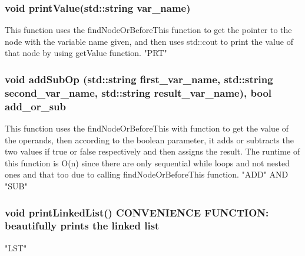 \documentclass[a4paper]{article}
\begin{document}
    \subsubsection{{\color{orange}void} {\color{draculapurple}printValue}({\color{orange}std::string} var\_name)}
    This function uses the {\color{draculapurple}findNodeOrBeforeThis} function to 
    get the pointer to the node with the variable name given, and then uses 
    {\color{orange}std::cout} to print the value of that node by using 
    {\color{draculapurple}getValue} function. "PRT"
    \subsubsection{{\color{orange}void} {\color{draculapurple}addSubOp}
    ({\color{orange}std::string} first\_var\_name, 
    {\color{orange}std::string} second\_var\_name,\newline 
    {\color{orange}std::string} result\_var\_name), 
    {\color{orange}bool} add\_or\_sub}
    This function uses the {\color{draculapurple}findNodeOrBeforeThis} with function 
    to get the value of the operands, then according to the boolean parameter, it adds
    or subtracts the two values if true or false respectively and then assigns the result. 
    The runtime of this function is {\color{lightblue}O(n)} since there are only sequential 
    while loops and not nested ones and that too due to calling {\color{draculapurple}findNodeOrBeforeThis} function. "ADD" AND "SUB"
    \subsubsection{{\color{orange}void} {\color{draculapurple}printLinkedList}() {\color{awesome}CONVENIENCE FUNCTION:} {\color{yellow}beautifully prints the linked list}} 
    "LST"
\end{document}
